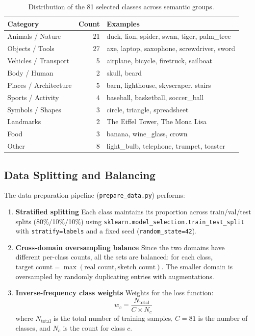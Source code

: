 \documentclass[12pt, a4paper]{article}
\begin{document}
\begin{table}[H]
\centering
\caption{Distribution of the 81 selected classes across semantic groups.}
\label{tab:classes}
\begin{tabular}{lrl}
\toprule
\textbf{Category} & \textbf{Count} & \textbf{Examples} \\
\midrule
Animals / Nature       & 21 & duck, lion, spider, swan, tiger, palm\_tree \\
Objects / Tools        & 27 & axe, laptop, saxophone, screwdriver, sword \\
Vehicles / Transport   &  5 & airplane, bicycle, firetruck, sailboat \\
Body / Human           &  2 & skull, beard \\
Places / Architecture  &  5 & barn, lighthouse, skyscraper, stairs \\
Sports / Activity      &  4 & baseball, basketball, soccer\_ball \\
Symbols / Shapes       &  3 & circle, triangle, spreadsheet \\
Landmarks              &  2 & The Eiffel Tower, The Mona Lisa \\
Food                   &  3 & banana, wine\_glass, crown \\
Other                  &  8 & light\_bulb, telephone, trumpet, toaster \\
\bottomrule
\end{tabular}
\end{table}

\subsection{Data Splitting and Balancing}

The data preparation pipeline (\texttt{prepare\_data.py}) performs:

\begin{enumerate}[leftmargin=*]
    \item \textbf{Stratified splitting} Each class maintains its proportion
          across train/val/test splits (80\%/10\%/10\%) using
          \texttt{sklearn.model\_selection.train\_test\_split} with
          \texttt{stratify=labels} and a fixed seed (\texttt{random\_state=42}).
    \item \textbf{Cross-domain oversampling balance} Since the two domains
          have different per-class counts, all the sets are balanced:
          for each class, $\text{target\_count} = \max(\text{real\_count},
          \text{sketch\_count})$.  The smaller domain is oversampled by
          randomly duplicating entries with augmentations.  
         
    \item \textbf{Inverse-frequency class weights}  Weights for the loss
          function:
          \begin{equation}
              w_c = \frac{N_{\text{total}}}{C \times N_c}
              \label{eq:class_weights}
          \end{equation}
          where $N_{\text{total}}$ is the total number of training samples,
          $C = 81$ is the number of classes, and $N_c$ is the count for class
          $c$.
\end{enumerate}
\end{document}
